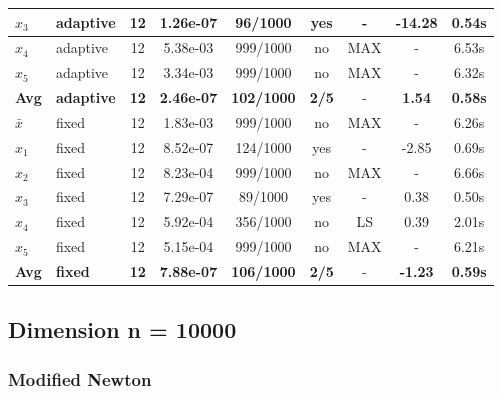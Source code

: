 \begin{longtable}{|l|l|c|c|c|c|c|c|c|}
\hline
$x_3$ & adaptive & 12 & 1.26e-07 & 96/1000 & yes & - & -14.28 & 0.54s \\
\hline
$x_4$ & adaptive & 12 & 5.38e-03 & 999/1000 & no & MAX & - & 6.53s \\
\hline
$x_5$ & adaptive & 12 & 3.34e-03 & 999/1000 & no & MAX & - & 6.32s \\
\hline
\hline\hline
\textbf{Avg} & \textbf{adaptive} & \textbf{12} & \textbf{2.46e-07} & \textbf{102/1000} & \textbf{2/5} & - & \textbf{1.54} & \textbf{0.58s} \\
\hline\hline
\hline
$\bar{x}$ & fixed & 12 & 1.83e-03 & 999/1000 & no & MAX & - & 6.26s \\
\hline
$x_1$ & fixed & 12 & 8.52e-07 & 124/1000 & yes & - & -2.85 & 0.69s \\
\hline
$x_2$ & fixed & 12 & 8.23e-04 & 999/1000 & no & MAX & - & 6.66s \\
\hline
$x_3$ & fixed & 12 & 7.29e-07 & 89/1000 & yes & - & 0.38 & 0.50s \\
\hline
$x_4$ & fixed & 12 & 5.92e-04 & 356/1000 & no & LS & 0.39 & 2.01s \\
\hline
$x_5$ & fixed & 12 & 5.15e-04 & 999/1000 & no & MAX & - & 6.21s \\
\hline
\hline\hline
\textbf{Avg} & \textbf{fixed} & \textbf{12} & \textbf{7.88e-07} & \textbf{106/1000} & \textbf{2/5} & - & \textbf{-1.23} & \textbf{0.59s} \\
\hline\hline
\end{longtable}


\subsection{Dimension n = 10000}

\subsubsection{Modified Newton}

